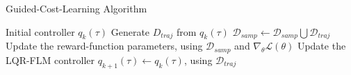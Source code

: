 \begin{algorithm}[htbp]
\caption{Guided-Cost-Learning Algorithm \cite{finn2016guided_cost_learning}}
\label{alg:guided_cost_learning}
\begin{algorithmic}
\Require Initial controller $q_{k}(\tau)$ 
    \State Generate $D_{traj}$ from $q_{k}(\tau)$
    \State $\mathcal{D}_{samp} \leftarrow \mathcal{D}_{samp} \bigcup \mathcal{D}_{traj}$
    \State Update the reward-function parameters, using $\mathcal{D}_{samp}$ and $\nabla_{\theta}\mathcal{L(\theta)}$
    \State Update the LQR-FLM \cite{levine2014lqr_flm} controller $q_{k+1}(\tau) \leftarrow q_{k}(\tau)$, using $\mathcal{D}_{traj}$
\EndFor
\end{algorithmic}
\end{algorithm}